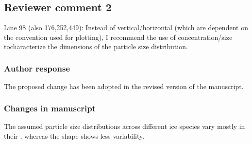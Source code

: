 \subsection*{Reviewer comment 2}

Line 98 (also 176,252,449): Instead of vertical/horizontal (which are
dependent on the convention used for plotting), I recommend the use of
concentration/size tocharacterize the dimensions of the particle size
distribution.

\subsubsection*{Author response}

The proposed change has been adopted in the revised version of the manuscript.

\subsubsection*{Changes in manuscript}

\begin{change}[95]
The \DIFdelbegin {}\DIFdelend assumed particle size distributions across
different ice species vary mostly in their \DIFdelbegin {}\DIFdelend \DIFaddbegin {}\DIFaddend , whereas the \DIFdelbegin {}\DIFdelend \DIFaddbegin {}\DIFaddend shape shows less variability.
\end{change}

